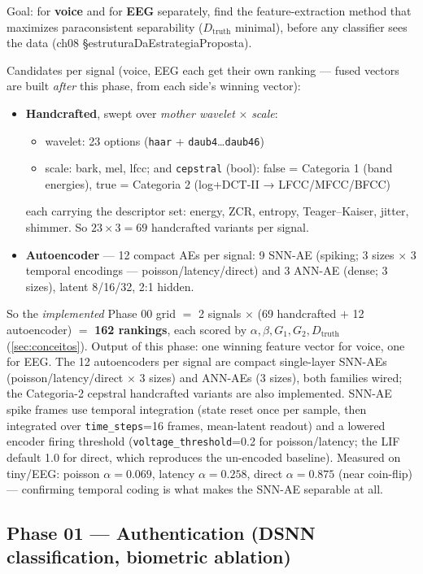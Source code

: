 Goal: for \textbf{voice} and for \textbf{EEG} separately, find the feature-extraction method that
maximizes paraconsistent separability ($D_{\text{truth}}$ minimal), before any classifier sees the data
(ch08 \S estruturaDaEstrategiaProposta).

Candidates per signal (voice, EEG each get their own ranking --- fused vectors are built \emph{after}
this phase, from each side's winning vector):
\begin{itemize}
    \item \textbf{Handcrafted}, swept over \emph{mother wavelet} $\times$ \emph{scale}:
    \begin{itemize}
        \item wavelet: 23 options (\texttt{haar} + \texttt{daub4}\dots\texttt{daub46})
        \item scale: bark, mel, lfcc; and \texttt{cepstral} (bool): false = Categoria 1 (band energies), true = Categoria 2 (log+DCT-II → LFCC/MFCC/BFCC)
    \end{itemize}
    each carrying the descriptor set: energy, ZCR, entropy, Teager--Kaiser, jitter, shimmer.
    So $23 \times 3 = 69$ handcrafted variants per signal.
    \item \textbf{Autoencoder} --- 12 compact AEs per signal: 9 SNN-AE (spiking; 3 sizes $\times$ 3 temporal encodings --- poisson/latency/direct) and 3 ANN-AE (dense; 3 sizes), latent 8/16/32, 2:1 hidden.
\end{itemize}

So the \emph{implemented} Phase 00 grid $=$ 2 signals $\times$ (69 handcrafted $+$ 12 autoencoder)
$=$ \textbf{162 rankings}, each scored by $\alpha,\beta,G_1,G_2,D_{\text{truth}}$
(\autoref{sec:conceitos}). Output of this phase: one winning feature vector for voice, one for EEG.
The 12 autoencoders per signal are compact single-layer SNN-AEs (poisson/latency/direct $\times$ 3 sizes)
and ANN-AEs (3 sizes), both families wired; the Categoria-2 cepstral handcrafted variants are also
implemented. SNN-AE spike frames use temporal integration (state reset once per sample, then
integrated over \texttt{time\_steps}=16 frames, mean-latent readout) and a lowered encoder firing
threshold (\texttt{voltage\_threshold}=0.2 for poisson/latency; the LIF default 1.0 for direct, which
reproduces the un-encoded baseline). Measured on tiny/EEG: poisson $\alpha=0.069$, latency
$\alpha=0.258$, direct $\alpha=0.875$ (near coin-flip) --- confirming temporal coding is what makes the
SNN-AE separable at all.

\subsection*{Phase 01 --- Authentication (DSNN classification, biometric ablation)}

